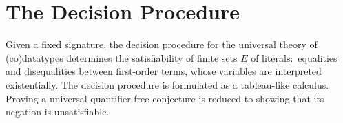 \documentclass[letter]{article}
\newcommand\MU{\vvthinspace\mu\vvthinspace}
\newtheorem{lemma}{Lemma}
\theoremstyle{definition}
\newcommand\afterDot{\;} %
\newcommand\Sig{\mathrm{\Sigma}}
\newcommand\keyw[1]{\textbf{#1}}
\newcommand\const[1]{\textsf{#1}}
\newcommand\ty[1]{\textit{#1}}
\newcommand{\Ec}{E}
\newcommand{\JJJJ}{\mathcal{\!J\!}}
\newcommand{\thD}{\mathcalx{DC}}
\newcommand\vvthinspace{\kern+0.041667em}
\newcommand\vthinspace{\kern+0.083333em}
\begin{document}
%
%

\section{The Decision Procedure} %
\label{sec:the-decision-procedure}

Given a fixed signature, %
the decision procedure for the universal theory of (co)data\-types %
determines the
satisfiability of finite sets $\Ec$ of literals:\ equalities
and disequalities between first-order terms, %
whose variables are interpreted existentially.
The decision procedure is formulated as a tableau-like calculus.
Proving a universal quantifier-free conjecture is reduced to showing that
its negation is unsatisfiable. 
\end{document}

